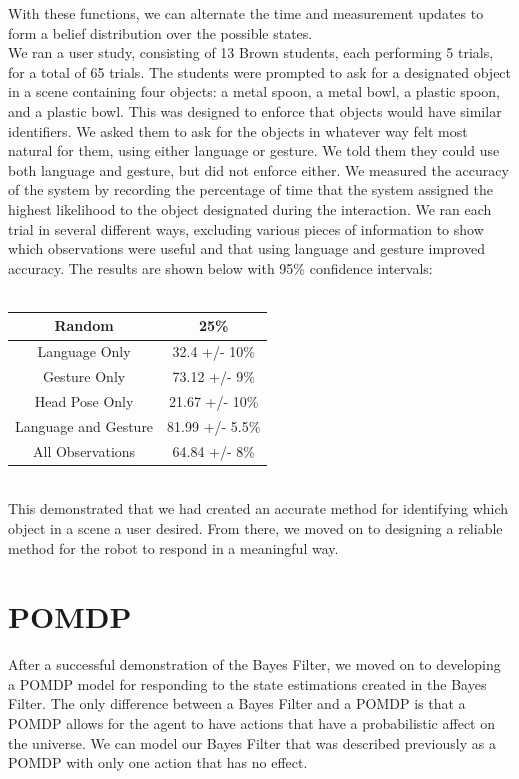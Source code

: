 \documentclass[a4paper, 11pt]{article} %
\begin{document}
With these functions, we can alternate the time and measurement updates to form a belief distribution over the possible states.\\
We ran a user study, consisting of 13 Brown students, each performing 5 trials, for a total of 65 trials. The students were prompted to ask for a designated object in a scene containing four objects: a metal spoon, a metal bowl, a plastic spoon, and a plastic bowl. This was designed to enforce that objects would have similar identifiers. We asked them to ask for the objects in whatever way felt most natural for them, using either language or gesture. We told them they could use both language and gesture, but did not enforce either. We measured the accuracy of the system by recording the percentage of time that the system assigned the highest likelihood to the object designated during the interaction. We ran each trial in several different ways, excluding various pieces of information to show which observations were useful and that using language and gesture improved accuracy. The results are shown below with 95\% confidence intervals:\\\\
\begin{tabular}{|c|c|}
\hline
Random & 25\%\\\hline
Language Only & 32.4 +/- 10\%\\\hline
Gesture Only & 73.12 +/- 9\%\\\hline
Head Pose Only & 21.67 +/- 10\%\\\hline
Language and Gesture & 81.99 +/- 5.5\%\\\hline
All Observations & 64.84 +/- 8\%\\\hline
\end{tabular}\\
This demonstrated that we had created an accurate method for identifying which object in a scene a user desired. From there, we moved on to designing a reliable method for the robot to respond in a meaningful way.
\section*{POMDP}
After a successful demonstration of the Bayes Filter, we moved on to developing a POMDP model for responding to the state estimations created in the Bayes Filter. The only difference between a Bayes Filter and a POMDP is that a POMDP allows for the agent to have actions that have a probabilistic affect on the universe. We can model our Bayes Filter that was described previously as a POMDP with only one action that has no effect.
\end{document}
